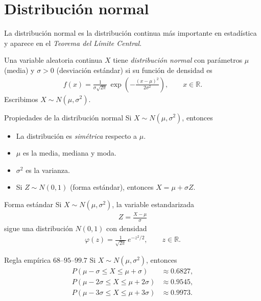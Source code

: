 \section{Distribución normal}

La distribución normal es la distribución continua más importante en estadística
y aparece en el \emph{Teorema del Límite Central}.

\begin{definicion}
Una variable aleatoria continua $X$ tiene \emph{distribución normal} con parámetros
$\mu$ (media) y $\sigma > 0$ (desviación estándar) si su función de densidad es
\begin{align}
 \label{eq:2.8.3}
 f(x) = \frac{1}{\sigma\sqrt{2\pi}}\,\exp\!\left(-\frac{(x-\mu)^2}{2\sigma^2}\right),
 \qquad x \in \mathbb{R}.
\end{align}
Escribimos $X \sim N(\mu, \sigma^2)$.
\end{definicion}

{Propiedades de la distribución normal} Si $X \sim N(\mu,\sigma^2)$, entonces
\begin{itemize}
 \item La distribución es \emph{simétrica} respecto a $\mu$.
 \item $\mu$ es la media, mediana y moda.
 \item $\sigma^2$ es la varianza.
 \item Si $Z \sim N(0,1)$ (forma estándar), entonces
 $X = \mu + \sigma Z$.
\end{itemize}

{Forma estándar} Si $X \sim N(\mu, \sigma^2)$, la variable estandarizada
\begin{align}
 \label{eq:2.8.4}
 Z = \frac{X - \mu}{\sigma}
\end{align}
sigue una distribución $N(0,1)$ con densidad
\begin{align}
 \label{eq:2.8.5}
 \varphi(z) = \frac{1}{\sqrt{2\pi}}\,e^{-z^2/2}, \qquad z \in \mathbb{R}.
\end{align}

{Regla empírica $68$--$95$--$99.7$} Si $X \sim N(\mu,\sigma^2)$, entonces
\begin{align}
 P(\mu - \sigma \leq X \leq \mu + \sigma) &\approx 0.6827, \\
 P(\mu - 2\sigma \leq X \leq \mu + 2\sigma) &\approx 0.9545, \\
 P(\mu - 3\sigma \leq X \leq \mu + 3\sigma) &\approx 0.9973.
\end{align}


